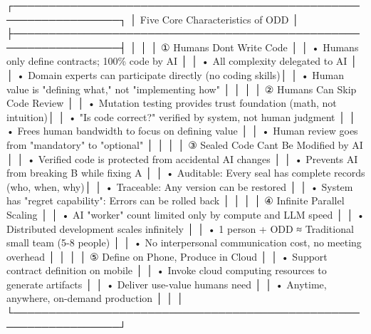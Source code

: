 \documentclass[
]{article}
\newenvironment{Shaded}{}{}
\newcommand{\NormalTok}[1]{#1}
\begin{document}
\begin{Shaded}
\begin{Highlighting}[]
\NormalTok{┌─────────────────────────────────────────────────────────────────┐}
\NormalTok{│               Five Core Characteristics of ODD                   │}
\NormalTok{├─────────────────────────────────────────────────────────────────┤}
\NormalTok{│                                                                  │}
\NormalTok{│  ① Humans Don\textquotesingle{}t Write Code                                      │}
\NormalTok{│     • Humans only define contracts; 100\% code by AI             │}
\NormalTok{│     • All complexity delegated to AI                            │}
\NormalTok{│     • Domain experts can participate directly (no coding skills)│}
\NormalTok{│     • Human value is "defining what," not "implementing how"    │}
\NormalTok{│                                                                  │}
\NormalTok{│  ② Humans Can Skip Code Review                                  │}
\NormalTok{│     • Mutation testing provides trust foundation (math, not intuition)│}
\NormalTok{│     • "Is code correct?" verified by system, not human judgment │}
\NormalTok{│     • Frees human bandwidth to focus on defining value          │}
\NormalTok{│     • Human review goes from "mandatory" to "optional"          │}
\NormalTok{│                                                                  │}
\NormalTok{│  ③ Sealed Code Can\textquotesingle{}t Be Modified by AI                          │}
\NormalTok{│     • Verified code is protected from accidental AI changes     │}
\NormalTok{│     • Prevents AI from breaking B while fixing A                │}
\NormalTok{│     • Auditable: Every seal has complete records (who, when, why)│}
\NormalTok{│     • Traceable: Any version can be restored                    │}
\NormalTok{│     • System has "regret capability": Errors can be rolled back │}
\NormalTok{│                                                                  │}
\NormalTok{│  ④ Infinite Parallel Scaling                                    │}
\NormalTok{│     • AI "worker" count limited only by compute and LLM speed   │}
\NormalTok{│     • Distributed development scales infinitely                 │}
\NormalTok{│     • 1 person + ODD ≈ Traditional small team (5{-}8 people)      │}
\NormalTok{│     • No interpersonal communication cost, no meeting overhead  │}
\NormalTok{│                                                                  │}
\NormalTok{│  ⑤ Define on Phone, Produce in Cloud                            │}
\NormalTok{│     • Support contract definition on mobile                     │}
\NormalTok{│     • Invoke cloud computing resources to generate artifacts    │}
\NormalTok{│     • Deliver use{-}value humans need                             │}
\NormalTok{│     • Anytime, anywhere, on{-}demand production                   │}
\NormalTok{│                                                                  │}
\NormalTok{└─────────────────────────────────────────────────────────────────┘}
\end{Highlighting}
\end{Shaded}
\end{document}

